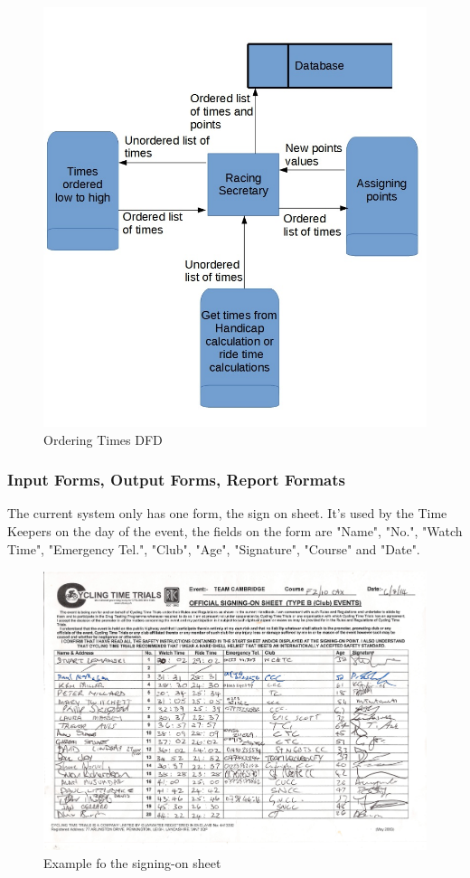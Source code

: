 \begin{figure}[H]
    \includegraphics[width=\textwidth]{./DFD/Done/JPG/OrderingTimes.jpg}
    \caption{Ordering Times DFD} \label{fig:Orgering times DFD}
\end{figure}


\subsubsection{Input Forms, Output Forms, Report Formats}
The current system only has one form, the sign on sheet. It's used by the Time Keepers on the day of the event, the fields on the form are "Name", "No.", "Watch Time", "Emergency Tel.", "Club", "Age", "Signature", "Course" and "Date".

\begin{figure}[H]
    \includegraphics[width=\textwidth]{./SignOnTimeKeepersSheet.pdf}
    \caption{Example fo the signing-on sheet} \label{fig:Example fo the signing-on sheet}
\end{figure}

